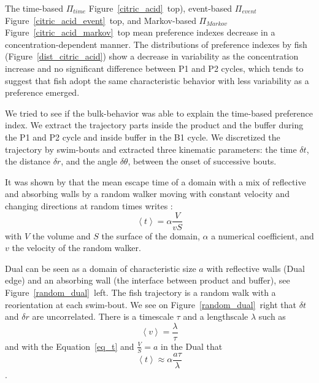   The time-based $\Pi_{time}$ Figure~\ref{citric_acid}~top), event-based $\Pi_{event}$ Figure~\ref{citric_acid_event}~top, and Markov-based $\Pi_{Markov}$ Figure~\ref{citric_acid_markov}~top mean preference indexes decrease in a concentration-dependent manner. The distributions of preference indexes by fish (Figure~\ref{dist_citric_acid}) show a decrease in variability as the concentration increase and no significant difference between P1 and P2 cycles, which tends to suggest that fish adopt the same characteristic behavior with less variability as a preference emerged.

  We tried to see if the bulk-behavior was able to explain the time-based preference index. We extract the  trajectory parts inside the product and the buffer during the P1 and P2 cycle and inside buffer in the B1 cycle. We discretized the trajectory by swim-bouts \cite{} and extracted three kinematic parameters: the time $\delta t$, the distance $\delta r$, and the angle $\delta \theta$, between the onset of successive bouts.

  It was shown by \cite{benichou2005averaged} that the mean escape time of a domain with a mix of reflective and absorbing walls by a random walker moving with constant velocity and changing directions at random times writes :
  \begin{equation}
    \label{eq_t}
    \left< t \right> = \alpha \frac{V}{vS}
  \end{equation}
  \noindent with $V$ the volume and $S$ the surface of the domain, $\alpha$ a numerical coefficient, and $v$ the velocity of the random walker.

  Dual can be seen as a domain of characteristic size $a$ with reflective walls (Dual edge) and an absorbing wall (the interface between product and buffer), see Figure~\ref{random_dual}~left. The fish trajectory is a random walk with a reorientation at each swim-bout. We see on Figure~\ref{random_dual}~right that $\delta t$ and $\delta r$ are uncorrelated. There is a timescale $\tau$ and a lengthscale $\lambda$ such as
  \begin{equation}
    \left< v \right> = \frac{\lambda}{\tau}
  \end{equation}
  \noindent and with the Equation~\ref{eq_t} and $\frac{V}{S}=a$ in the Dual that
  \begin{equation}
    \left< t \right> \approx \alpha \frac{a \tau}{\lambda}
  \end{equation}.

